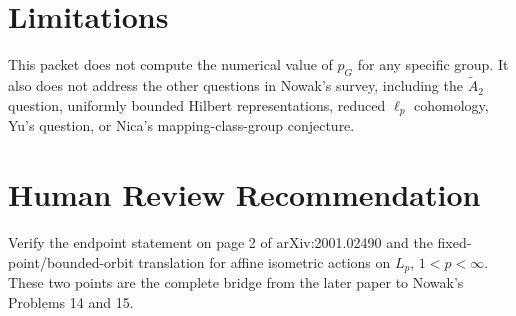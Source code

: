 \documentclass[11pt]{article}
\begin{document}
\section*{Limitations}

This packet does not compute the numerical value of $p_G$ for any specific
group.  It also does not address the other questions in Nowak's survey,
including the $\widetilde A_2$ question, uniformly bounded Hilbert
representations, reduced $\ell_p$ cohomology, Yu's question, or Nica's
mapping-class-group conjecture.

\section*{Human Review Recommendation}

Verify the endpoint statement on page 2 of arXiv:2001.02490 and the
fixed-point/bounded-orbit translation for affine isometric actions on
$L_p$, $1<p<\infty$.  These two points are the complete bridge from the later
paper to Nowak's Problems 14 and 15.
\end{document}
